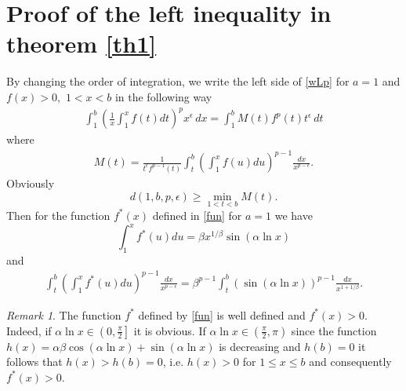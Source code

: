 \documentclass{amsart}
\theoremstyle{definition}
\theoremstyle{remark}
\newtheorem{remark}[theorem]{Remark}
\numberwithin{equation}{section}
\begin{document}
\section{Proof of the left inequality in theorem \ref{th1} }
By changing the order of integration, we write the left side of \eqref{wLp} for
 $a=1$ and $f(x)>0,\,\,1<x<b$ in the following way
\begin{align*}
\int_1^b\left(\frac{1}{x}\int_1^xf(t)dt\right)^p \!x^\epsilon\,dx=\int_1^b M(t)f^p(t)t^\epsilon\,dt
\end{align*}
where
\begin{align*}
M(t)=\frac{1}{t^\epsilon f^{p-1}(t)}\int_t^b\left(\int_1^x f(u)du \right)^{p-1}\frac{dx}{x^{p-\epsilon}}. 
\end{align*}
Obviously
\[
d(1,b,p,\epsilon)\geq \min_{1< t< b}M(t).
\]
Then for the function $f^*(x)$ defined in \eqref{fun} for $a=1$ we have
\[
\int_1^x f^*(u)du=\beta x^{1/\beta}\sin(\alpha\ln x)
\]
and
\begin{align*}\label{eqI7}
\int_t^b\left(\int_1^x f^*(u)du \right)^{p-1}\frac{dx}{x^{p-\epsilon}}
=\beta^{p-1}\int_t^b (\sin(\alpha\ln x))^{p-1}\frac{dx}{x^{1+1/\beta}}.
\end{align*}
\begin{remark}
	The function $f^*$ defined by \eqref{fun} is well defined and $f^*(x)>0$. Indeed, if 
	$\alpha\ln x\in \left(0,\frac{\pi}{2}\right]$ it is obvious. If 
	$\alpha\ln x\in \left(\frac{\pi}{2},\pi \right)$ since the function
	$h(x)=\alpha \beta\cos(\alpha\ln x)+\sin(\alpha\ln x)$ 
	is decreasing and $h(b)=0$ it follows that $h(x)>h(b)=0$, i.e. $h(x)>0$ for $1\le x\le b$ and
	 consequently $f^*(x)>0$.
	\end{remark}
\end{document}
